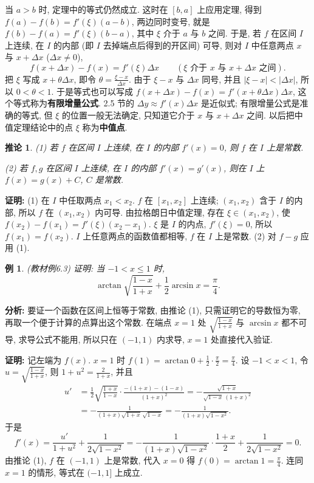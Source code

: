 \documentclass[UTF8,openany]{ctexbook}
\theoremstyle{chinesetextbook}
\newtheorem{example}{例}[section]
\newenvironment{cnproof}{\par\indent\textbf{证明:} \ignorespaces}{\par}
\newtheorem*{corollarysingle}{推论}
\begin{document}
当 $a>b$ 时, 定理中的等式仍然成立. 这时在 $[b,a]$ 上应用定理, 得到 $f(a)-f(b)=f'(\xi)(a-b)$, 两边同时变号, 就是 $f(b)-f(a)=f'(\xi)(b-a)$, 其中 $\xi$ 介于 $a$ 与 $b$ 之间. 于是, 若 $f$ 在区间 $I$ 上连续, 在 $I$ 的内部 (即 $I$ 去掉端点后得到的开区间) 可导, 则对 $I$ 中任意两点 $x$ 与 $x+\Delta x$ ($\Delta x\ne0$),
\[
f(x+\Delta x)-f(x)=f'(\xi)\Delta x\qquad(\xi\text{ 介于 }x\text{ 与 }x+\Delta x\text{ 之间}).
\]
把 $\xi$ 写成 $x+\theta\Delta x$, 即令 $\displaystyle\theta=\frac{\xi-x}{\Delta x}$. 由于 $\xi-x$ 与 $\Delta x$ 同号, 并且 $|\xi-x|<|\Delta x|$, 所以 $0<\theta<1$. 于是等式也可以写成 $f(x+\Delta x)-f(x)=f'(x+\theta\Delta x)\Delta x$, 这个等式称为\textbf{有限增量公式}. 2.5 节的 $\Delta y\approx f'(x)\Delta x$ 是近似式; 有限增量公式是准确的等式, 但 $\xi$ 的位置一般无法确定, 只知道它介于 $x$ 与 $x+\Delta x$ 之间. 以后把中值定理结论中的点 $\xi$ 称为\textbf{中值点}.
\begin{corollarysingle}
\textup{(1)} 若 $f$ 在区间 $I$ 上连续, 在 $I$ 的内部 $f'(x)=0$, 则 $f$ 在 $I$ 上是常数.

\textup{(2)} 若 $f,g$ 在区间 $I$ 上连续, 在 $I$ 的内部 $f'(x)=g'(x)$, 则在 $I$ 上 $f(x)=g(x)+C$, $C$ 是常数.
\end{corollarysingle}
\begin{cnproof}
(1) 在 $I$ 中任取两点 $x_1<x_2$. $f$ 在 $[x_1,x_2]$ 上连续; $(x_1,x_2)$ 含于 $I$ 的内部, 所以 $f$ 在 $(x_1,x_2)$ 内可导. 由拉格朗日中值定理, 存在 $\xi\in(x_1,x_2)$, 使 $f(x_2)-f(x_1)=f'(\xi)(x_2-x_1)$. $\xi$ 是 $I$ 的内点, $f'(\xi)=0$, 所以 $f(x_1)=f(x_2)$. $I$ 上任意两点的函数值都相等, $f$ 在 $I$ 上是常数. (2) 对 $f-g$ 应用 (1).
\end{cnproof}
\begin{example}\label{ex:c2-6-3}
\textnormal{(教材例6.3)} 证明: 当 $-1<x\le1$ 时,
\[
\arctan\sqrt{\frac{1-x}{1+x}}+\frac12\arcsin x=\frac\pi4.
\]
\end{example}
\par\indent\textbf{分析:} 要证一个函数在区间上恒等于常数, 由推论 (1), 只需证明它的导数恒为零, 再取一个便于计算的点算出这个常数. 在端点 $x=1$ 处 $\displaystyle\sqrt{\frac{1-x}{1+x}}$ 与 $\arcsin x$ 都不可导, 求导公式不能用, 所以只在 $(-1,1)$ 内求导, $x=1$ 处直接代入验证.
\begin{cnproof}
记左端为 $f(x)$. $x=1$ 时 $\displaystyle f(1)=\arctan0+\frac12\cdot\frac\pi2=\frac\pi4$. 设 $-1<x<1$, 令 $\displaystyle u=\sqrt{\frac{1-x}{1+x}}$, 则 $\displaystyle1+u^2=\frac2{1+x}$, 并且
\[
\begin{aligned}
u'&=\frac12\sqrt{\frac{1+x}{1-x}}\cdot\frac{-(1+x)-(1-x)}{(1+x)^2}=-\frac{\sqrt{1+x}}{\sqrt{1-x}\,(1+x)^2}\\
&=-\frac1{(1+x)\sqrt{1+x}\,\sqrt{1-x}}=-\frac1{(1+x)\sqrt{1-x^2}}.
\end{aligned}
\]
于是
\[
f'(x)=\frac{u'}{1+u^2}+\frac1{2\sqrt{1-x^2}}=-\frac1{(1+x)\sqrt{1-x^2}}\cdot\frac{1+x}2+\frac1{2\sqrt{1-x^2}}=0.
\]
由推论 (1), $f$ 在 $(-1,1)$ 上是常数, 代入 $x=0$ 得 $\displaystyle f(0)=\arctan1=\frac\pi4$. 连同 $x=1$ 的情形, 等式在 $(-1,1]$ 上成立.
\end{cnproof}
\end{document}
